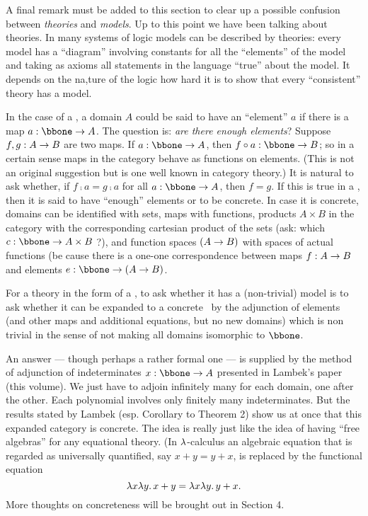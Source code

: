 A final remark must be added to this section to clear up a possible confusion between {\it theories} and {\it models}.
Up to this point we have been talking about theories. In many systems of logic models can be described by theories: every model has a ``diagram'' involving constants for all the ``elements'' of the model and taking as axioms all statements in the language ``true'' about the model. It depends on the na,ture of the logic how hard it is to show that every ``consistent'' theory has a model.

In the case of a \ccc, a domain $A$ could be said to have an ``element'' $a$ if there is a map $a: \bbone \to A$. The question is: {\it are there enough elements}? Suppose $f,g: A \rightarrow B$ are two maps. If $a : \bbone \to A$, then $f \comp a: \bbone \to B$; so in a certain sense maps in the category behave as functions on elements. (This is not an original suggestion but is one well known in category theory.) It is natural to ask whether, if  $f \comp a = g\comp a$ for all $a : \bbone \to A$, then $f = g$. If this is true in a \ccc, then it is said to have ``enough'' elements or to be concrete. In case it is concrete, domains can be identified with sets, maps with functions, products $A \times B$ in the category with the corresponding cartesian product of the sets (ask: which $c : \bbone \to A \times B$ ?), and function spaces $(A \rightarrow B)$ with spaces of actual functions (be cause there is a one-one correspondence between maps $f : A \rightarrow B$ and elements $e: \bbone \to (\AB)$.

For a theory in the form of a \ccc, to ask whether it has a (non-trivial) model is to ask whether it can be expanded to a concrete \ccc\ by the adjunction of elements (and other maps and additional equations, but no new domains) which is non trivial in the sense of not making all domains isomorphic to $\bbone$.

An answer --- though perhaps a rather formal one --- is supplied by the method of adjunction of indeterminates $x: \bbone \to A$ presented in Lambek's paper (this volume). We just have to adjoin infinitely many for each domain, one after the other. Each polynomial involves only finitely many indeterminates. But the results stated by Lambek (esp. Corollary to Theorem 2) show us at once that this expanded category is concrete. The idea is really just like the idea of having ``free algebras'' for any equational theory. (In $\lambda$-calculus an algebraic equation that is regarded as universally quantified, say $x + y = y + x$, is replaced by the functional equation
$$
\lambda x \lambda y . \, x + y = \lambda x \lambda y . \, y + x.
$$
%
More thoughts on concreteness will be brought out in Section 4.

